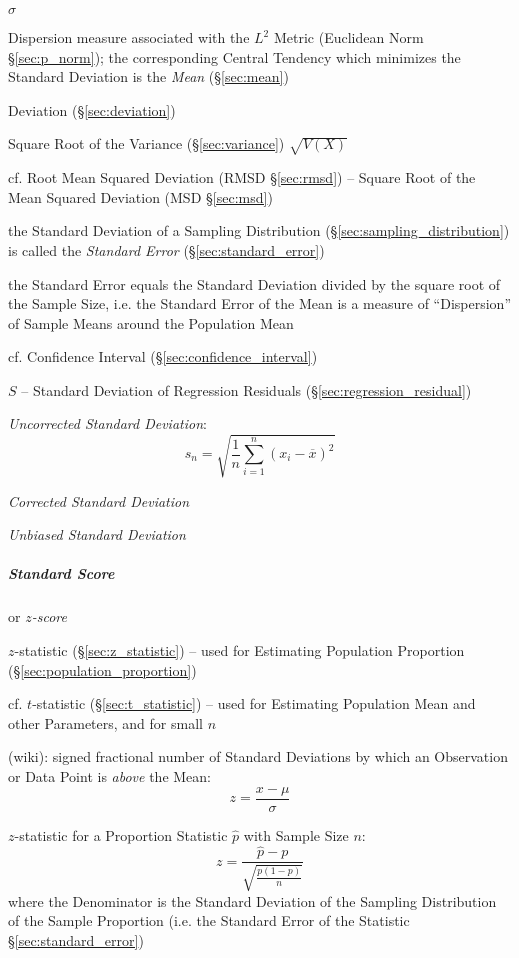 $\sigma$

Dispersion measure associated with the $L^2$ Metric (Euclidean Norm
\S\ref{sec:p_norm}); the corresponding Central Tendency which minimizes the
Standard Deviation is the \emph{Mean} (\S\ref{sec:mean})

Deviation (\S\ref{sec:deviation})

Square Root of the Variance (\S\ref{sec:variance}) $\sqrt{V(X)}$

cf. Root Mean Squared Deviation (RMSD \S\ref{sec:rmsd}) -- Square Root of the
Mean Squared Deviation (MSD \S\ref{sec:msd})

the Standard Deviation of a Sampling Distribution
(\S\ref{sec:sampling_distribution}) is called the \emph{Standard Error}
(\S\ref{sec:standard_error})

the Standard Error equals the Standard Deviation divided by the square root of
the Sample Size, i.e. the Standard Error of the Mean is a measure of
``Dispersion'' of Sample Means around the Population Mean

cf. Confidence Interval (\S\ref{sec:confidence_interval})

$S$ -- Standard Deviation of Regression Residuals
(\S\ref{sec:regression_residual})

\emph{Uncorrected Standard Deviation}:
\[
  s_n = \sqrt{\frac{1}{n}\sum_{i=1}^n (x_i - \overline{x})^2}
\]

\emph{Corrected Standard Deviation}

\emph{Unbiased Standard Deviation}



\subparagraph{Standard Score}\label{sec:standard_score}\hfill

or \emph{$z$-score}

$z$-statistic (\S\ref{sec:z_statistic}) -- used for Estimating Population
Proportion (\S\ref{sec:population_proportion})

cf. $t$-statistic (\S\ref{sec:t_statistic}) -- used for Estimating Population
Mean and other Parameters, and for small $n$

(wiki): signed fractional number of Standard Deviations by which an Observation
or Data Point is \emph{above} the Mean:
\[
  z = \frac{x - \mu}{\sigma}
\]

$z$-statistic for a Proportion Statistic $\hat{p}$ with Sample Size $n$:
\[
  z = \frac{\hat{p} - p}{\sqrt{\frac{p(1-p)}{n}}}
\]
where the Denominator is the Standard Deviation of the Sampling Distribution of
the Sample Proportion (i.e. the Standard Error of the Statistic
\S\ref{sec:standard_error})

